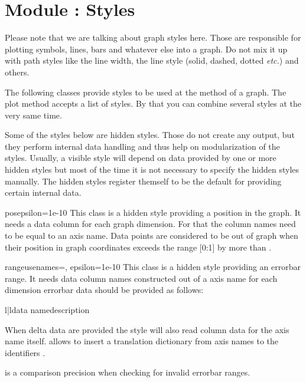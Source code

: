 
\section{Module : Styles} %
\label{graph:style}


Please note that we are talking about graph styles here. Those are
responsible for plotting symbols, lines, bars and whatever else into a
graph. Do not mix it up with path styles like the line width, the line
style (solid, dashed, dotted \emph{etc.}) and others.

The following classes provide styles to be used at the 
method of a graph. The plot method accepts a list of styles. By that
you can combine several styles at the very same time.

Some of the styles below are hidden styles. Those do not create any
output, but they perform internal data handling and thus help on
modularization of the styles. Usually, a visible style will depend on
data provided by one or more hidden styles but most of the time it is
not necessary to specify the hidden styles manually. The hidden styles
register themself to be the default for providing certain internal
data.

\begin{classdesc}{pos}{epsilon=1e-10} %
  This class is a hidden style providing a position in the graph. It
  needs a data column for each graph dimension. For that the column
  names need to be equal to an axis name. Data points are considered
  to be out of graph when their position in graph coordinates exceeds
  the range [0:1] by more than .
\end{classdesc} %

\begin{classdesc}{range}{usenames={}, epsilon=1e-10} %
  This class is a hidden style providing an errorbar range. It needs
  data column names constructed out of a axis name  for each
  dimension errorbar data should be provided as follows:
  \begin{tableii}{l|l}{}{data name}{description}
  \end{tableii}
  When delta data are provided the style will also read column data
  for the axis name  itself.  allows to insert a
  translation dictionary from axis names to the identifiers .

   is a comparison precision when checking for invalid
  errorbar ranges.
\end{classdesc} %

